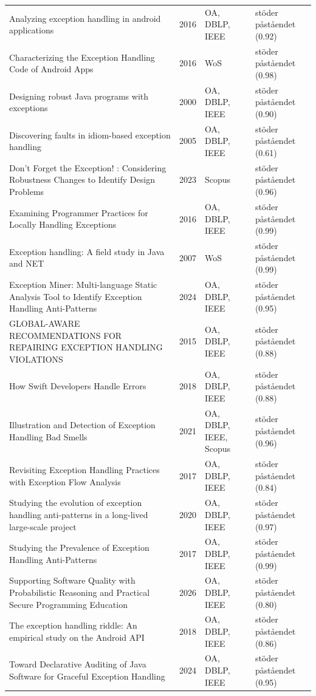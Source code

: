 \begin{longtable}{@{}%
  >{\raggedright\arraybackslash}p{}c%
  >{\raggedright\arraybackslash}p{}%
  >{\raggedright\arraybackslash}p{}@{}}
Analyzing exception handling in android applications & 2016 & OA, DBLP, IEEE & stöder påståendet (0.92) \\
Characterizing the Exception Handling Code of Android Apps & 2016 & WoS & stöder påståendet (0.98) \\
Designing robust Java programs with exceptions & 2000 & OA, DBLP, IEEE & stöder påståendet (0.90) \\
Discovering faults in idiom-based exception handling & 2005 & OA, DBLP, IEEE & stöder påståendet (0.61) \\
Don't Forget the Exception! : Considering Robustness Changes to Identify Design Problems & 2023 & Scopus & stöder påståendet (0.96) \\
Examining Programmer Practices for Locally Handling Exceptions & 2016 & OA, DBLP, IEEE & stöder påståendet (0.99) \\
Exception handling: A field study in Java and NET & 2007 & WoS & stöder påståendet (0.99) \\
Exception Miner: Multi-language Static Analysis Tool to Identify Exception Handling Anti-Patterns & 2024 & OA, DBLP, IEEE & stöder påståendet (0.95) \\
GLOBAL-AWARE RECOMMENDATIONS FOR REPAIRING EXCEPTION HANDLING VIOLATIONS & 2015 & OA, DBLP, IEEE & stöder påståendet (0.88) \\
How Swift Developers Handle Errors & 2018 & OA, DBLP, IEEE & stöder påståendet (0.88) \\
Illustration and Detection of Exception Handling Bad Smells & 2021 & OA, DBLP, IEEE, Scopus & stöder påståendet (0.96) \\
Revisiting Exception Handling Practices with Exception Flow Analysis & 2017 & OA, DBLP, IEEE & stöder påståendet (0.84) \\
Studying the evolution of exception handling anti-patterns in a long-lived large-scale project & 2020 & OA, DBLP, IEEE & stöder påståendet (0.97) \\
Studying the Prevalence of Exception Handling Anti-Patterns & 2017 & OA, DBLP, IEEE & stöder påståendet (0.99) \\
Supporting Software Quality with Probabilistic Reasoning and Practical Secure Programming Education & 2026 & OA, DBLP, IEEE & stöder påståendet (0.80) \\
The exception handling riddle: An empirical study on the Android API & 2018 & OA, DBLP, IEEE & stöder påståendet (0.86) \\
Toward Declarative Auditing of Java Software for Graceful Exception Handling & 2024 & OA, DBLP, IEEE & stöder påståendet (0.95) \\

\end{longtable}
